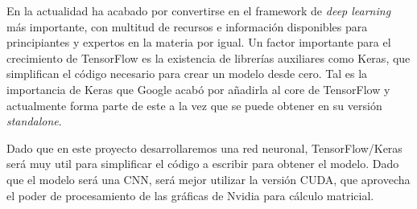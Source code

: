 En la actualidad ha acabado por convertirse en el framework de \textit{deep learning} más importante, con multitud de recursos e información disponibles para principiantes y expertos en la materia por igual. Un factor importante para el crecimiento de TensorFlow es la existencia de librerías auxiliares como Keras, que simplifican el código necesario para crear un modelo desde cero. Tal es la importancia de Keras que Google acabó por añadirla al core de TensorFlow y actualmente forma parte de este a la vez que se puede obtener en su versión \textit{standalone}.

Dado que en este proyecto desarrollaremos una red neuronal, TensorFlow/Keras será muy util para simplificar el código a escribir para obtener el modelo. Dado que el modelo será una CNN, será mejor utilizar la versión CUDA, que aprovecha el poder de procesamiento de las gráficas de Nvidia para cálculo matricial.

\newpage